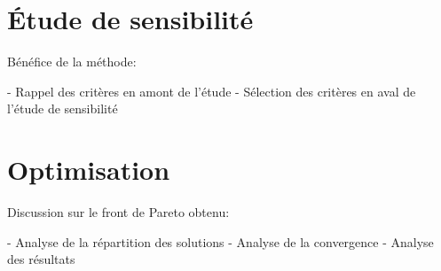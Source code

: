 
\section{Étude de sensibilité} %
\label{sec:etude_de_sensibilite}
Bénéfice de la méthode:

 - Rappel des critères en amont de l’étude
 - Sélection des critères en aval de l’étude de sensibilité


\section{Optimisation} %
\label{sec:optimisation}
Discussion sur le front de Pareto obtenu:

 - Analyse de la répartition des solutions
 - Analyse de la convergence
 - Analyse des résultats
